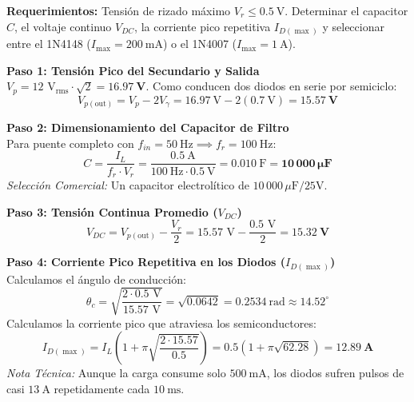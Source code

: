 \documentclass[11pt, a4paper]{article}
\begin{document}
\textbf{Requerimientos:} Tensión de rizado máximo $V_r \le \qty{0.5}{\volt}$. Determinar el capacitor $C$, el voltaje continuo $V_{DC}$, la corriente pico repetitiva $I_{D(\max)}$ y seleccionar entre el 1N4148 ($I_{\max} = \qty{200}{\milli\ampere}$) o el 1N4007 ($I_{\max} = \qty{1}{\ampere}$).

\vspace{0.3cm}
\noindent \textbf{Paso 1: Tensión Pico del Secundario y Salida}\\
$V_p = 12\text{ V}_{\text{rms}} \cdot \sqrt{2} = \mathbf{\qty{16.97}{\volt}}$. Como conducen dos diodos en serie por semiciclo:
\begin{equation*}
    V_{p(\text{out})} = V_p - 2V_\gamma = \qty{16.97}{\volt} - 2(\qty{0.7}{\volt}) = \mathbf{\qty{15.57}{\volt}}
\end{equation*}

\noindent \textbf{Paso 2: Dimensionamiento del Capacitor de Filtro}\\
Para puente completo con $f_{in} = \qty{50}{\hertz} \implies f_r = \qty{100}{\hertz}$:
\begin{equation*}
    C = \frac{I_L}{f_r \cdot V_r} = \frac{\qty{0.5}{\ampere}}{\qty{100}{\hertz} \cdot \qty{0.5}{\volt}} = \qty{0.010}{\farad} = \mathbf{10\,000\,\mu\text{F}}
\end{equation*}
\textit{Selección Comercial:} Un capacitor electrolítico de $10\,000\,\mu\text{F} / 25\text{V}$.

\noindent \textbf{Paso 3: Tensión Continua Promedio ($V_{DC}$)}\\
\begin{equation*}
    V_{DC} = V_{p(\text{out})} - \frac{V_r}{2} = 15.57\text{ V} - \frac{0.5\text{ V}}{2} = \mathbf{\qty{15.32}{\volt}}
\end{equation*}

\noindent \textbf{Paso 4: Corriente Pico Repetitiva en los Diodos ($I_{D(\max)}$)}\\
Calculamos el ángulo de conducción:
\begin{equation*}
    \theta_c = \sqrt{\frac{2 \cdot 0.5\text{ V}}{15.57\text{ V}}} = \sqrt{0.0642} = \qty{0.2534}{\radian} \approx 14.52^\circ
\end{equation*}
Calculamos la corriente pico que atraviesa los semiconductores:
\begin{equation*}
    I_{D(\max)} = I_L \left( 1 + \pi \sqrt{\frac{2 \cdot 15.57}{0.5}} \right) = 0.5 \left( 1 + \pi \sqrt{62.28} \right) = \mathbf{\qty{12.89}{\ampere}}
\end{equation*}
\textit{Nota Técnica:} Aunque la carga consume solo $\qty{500}{\milli\ampere}$, los diodos sufren pulsos de casi $\qty{13}{\ampere}$ repetidamente cada $\qty{10}{\milli\second}$.
\end{document}
